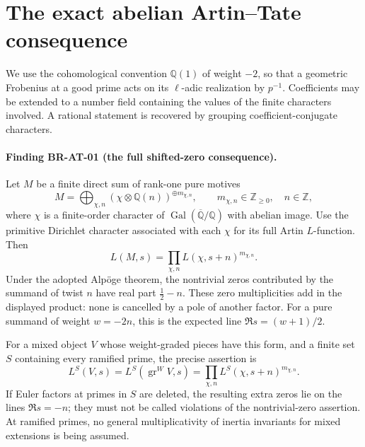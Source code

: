 \documentclass[11pt,a4paper]{article}
\theoremstyle{definition}\newtheorem{definition}[theorem]{Definition}
\theoremstyle{remark}\newtheorem{remark}[theorem]{Remark}
\begin{document}

\section{The exact abelian Artin--Tate consequence}
\label{sec:root-artin-tate}

We use the cohomological convention $\mathbb Q(1)$ of weight $-2$,
so that a geometric Frobenius at a good prime acts on its $\ell$-adic
realization by $p^{-1}$.  Coefficients may be extended to a number field
containing the values of the finite characters involved.  A rational
statement is recovered by grouping coefficient-conjugate characters.

\paragraph{Finding BR-AT-01 (the full shifted-zero consequence).}
Let $M$ be a finite direct sum of rank-one pure motives
\[
 M=\bigoplus_{\chi,n} (\chi\otimes\mathbb Q(n))^{\oplus m_{\chi,n}},
 \qquad m_{\chi,n}\in\mathbb Z_{\geq0},\quad n\in\mathbb Z,
\]
where $\chi$ is a finite-order character of
$\operatorname{Gal}(\overline{\mathbb Q}/\mathbb Q)$ with abelian image.
Use the primitive Dirichlet character associated with each $\chi$ for
its full Artin $L$-function.  Then
\[
 L(M,s)=\prod_{\chi,n}L(\chi,s+n)^{m_{\chi,n}}.
\]
Under the adopted Alp\"oge theorem, the nontrivial zeros contributed by
the summand of twist $n$ have real part $\tfrac12-n$.
These zero multiplicities add in the displayed product: none is cancelled
by a pole of another factor.  For a pure summand of weight $w=-2n$, this
is the expected line $\Re s=(w+1)/2$.

For a mixed object $V$ whose weight-graded pieces have this form, and a
finite set $S$ containing every ramified prime, the precise assertion is
\[
 L^S(V,s)=L^S(\operatorname{gr}^W V,s)
 =\prod_{\chi,n}L^S(\chi,s+n)^{m_{\chi,n}}.
\]
If Euler factors at primes in $S$ are deleted, the resulting extra zeros
lie on the lines $\Re s=-n$; they must not be called violations of the
nontrivial-zero assertion.  At ramified primes, no general multiplicativity
of inertia invariants for mixed extensions is being assumed.
\end{document}
